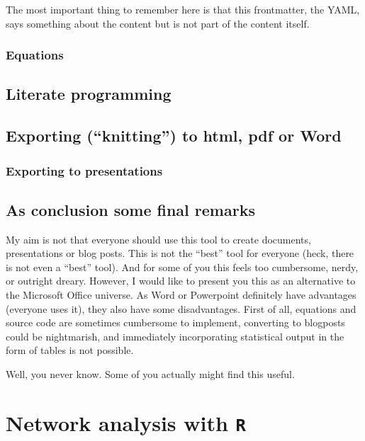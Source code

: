 \documentclass[]{article}
\theoremstyle{definition}
\theoremstyle{definition}
\theoremstyle{definition}
\theoremstyle{remark}
\begin{document}
The most important thing to remember here is that this frontmatter, the
YAML, says something about the content but is not part of the content
itself.

\subsubsection{Equations}\label{equations}

\subsection{Literate programming}\label{literate-programming}

\subsection{\texorpdfstring{Exporting (``knitting'') to html, pdf or
Word}{Exporting (knitting) to html, pdf or Word}}\label{exporting-knitting-to-html-pdf-or-word}

\subsubsection{Exporting to
presentations}\label{exporting-to-presentations}

\subsection{As conclusion some final
remarks}\label{as-conclusion-some-final-remarks}

My aim is not that everyone should use this tool to create documents,
presentations or blog posts. This is not the ``best'' tool for everyone
(heck, there is not even a ``best'' tool). And for some of you this
feels too cumbersome, nerdy, or outright dreary. However, I would like
to present you this as an alternative to the Microsoft Office universe.
As Word or Powerpoint definitely have advantages (everyone uses it),
they also have some disadvantages. First of all, equations and source
code are sometimes cumbersome to implement, converting to blogposts
could be nightmarish, and immediately incorporating statistical output
in the form of tables is not possible.

Well, you never know. Some of you actually might find this useful.

\section{\texorpdfstring{Network analysis with
\texttt{R}}{Network analysis with R}}\label{network-analysis-with-r}
\end{document}
